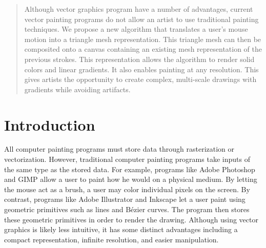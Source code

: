 \documentclass[review]{acmsiggraph}
\begin{document}
\maketitle

\begin{abstract}
Although vector graphics program have a number of advantages, current vector painting programs
do not allow an artist to use traditional painting techniques. We propose a new algorithm that translates a
user's mouse motion into a triangle mesh representation. This triangle mesh can then be composited onto
a canvas containing an existing mesh representation of the previous strokes. 
This representation allows the algorithm to render solid colors and linear
gradients. It also enables painting at any resolution. This gives artists the opportunity to create complex,
multi-scale drawings with gradients while avoiding artifacts.  

\end{abstract}

\begin{CRcatlist}
\end{CRcatlist}

\keywordlist


\TOGlinkslist


\copyrightspace

\section{Introduction}

All computer painting programs must store data through rasterization or vectorization. 
However, traditional computer painting programs take inputs of the same type as the stored data. 
For example, programs like Adobe Photoshop and GIMP
allow a user to paint how he would on a physical medium. By letting the mouse act as
a brush, a user may color individual pixels on the screen. By contrast, programs like 
Adobe Illustrator and Inkscape let a user paint
using geometric primitives such as lines and B\'{e}zier curves. The program then stores
these geometric primitives in order to render the drawing. Although using vector graphics
is likely less intuitive, it has some distinct advantages including a compact
representation, infinite resolution, and easier manipulation.
\end{document}
